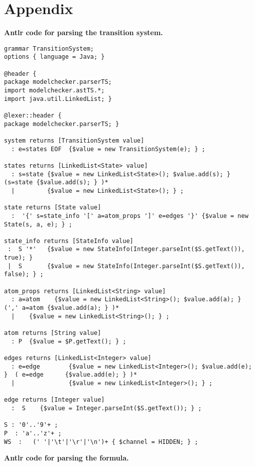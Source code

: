 \newpage
\section*{Appendix}
\begin{center}
\textbf{Antlr code for parsing the transition system.}
\end{center}

\begin{lstlisting}
grammar TransitionSystem;
options { language = Java; }

@header {
package modelchecker.parserTS;
import modelchecker.astTS.*;
import java.util.LinkedList; }

@lexer::header {
package modelchecker.parserTS; }

system returns [TransitionSystem value]
  : e=states EOF  {$value = new TransitionSystem(e); } ;

states returns [LinkedList<State> value]
  : s=state {$value = new LinkedList<State>(); $value.add(s); } (s=state {$value.add(s); } )*
  |         {$value = new LinkedList<State>(); } ;

state returns [State value]
  :  '{' s=state_info '[' a=atom_props ']' e=edges '}' {$value = new State(s, a, e); } ;

state_info returns [StateInfo value]
 :  S '*'   {$value = new StateInfo(Integer.parseInt($S.getText()), true); }
 |  S       {$value = new StateInfo(Integer.parseInt($S.getText()), false); } ;

atom_props returns [LinkedList<String> value]
  : a=atom    {$value = new LinkedList<String>(); $value.add(a); } (',' a=atom {$value.add(a); } )*
  |    {$value = new LinkedList<String>(); } ;

atom returns [String value]
  : P  {$value = $P.getText(); } ;

edges returns [LinkedList<Integer> value]
  : e=edge        {$value = new LinkedList<Integer>(); $value.add(e); }  ( e=edge      {$value.add(e); } )*
  |               {$value = new LinkedList<Integer>(); } ;

edge returns [Integer value]
  :  S    {$value = Integer.parseInt($S.getText()); } ;

S : '0'..'9'+ ;
P  : 'a'..'z'+ ;
WS  :   (' '|'\t'|'\r'|'\n')+ { $channel = HIDDEN; } ; 
\end{lstlisting}
 
 \newpage
 
 \begin{center}
\textbf{Antlr code for parsing the formula.}
\end{center}
 
